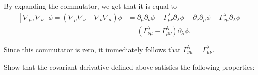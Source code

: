 \documentclass{../../templates/lkx_pset}
\begin{document}
\begin{solution}
	By expanding the commutator, we get that it is equal to
	\[
		\begin{aligned}
			[\nabla_\mu, \nabla_\nu]\phi = (\nabla_\mu\nabla_\nu - \nabla_\nu\nabla_\mu)\phi
			 & = \partial_\mu\partial_\nu \phi - \Gamma^\lambda_{\mu\nu}\partial_\lambda\phi - \partial_\nu\partial_\mu\phi - \Gamma^\lambda_{\nu\mu}\partial_\lambda \phi \\
			 & = (\Gamma^\lambda_{\nu\mu} - \Gamma^\lambda_{\mu\nu})\partial_\lambda \phi.
		\end{aligned}
	\]
\end{solution}
Since this commutator is zero, it immediately follows that $\Gamma^\lambda_{\nu\mu} = \Gamma^\lambda_{\mu\nu}$.

\begin{problem}{4}
Show that the covariant derivative defined above satisfies the following properties:
\end{problem}
\end{document}
